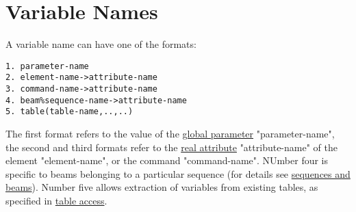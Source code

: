 
\section{Variable Names}
\label{sec:variable}

A variable name can have one of the formats: 
\begin{verbatim}
1. parameter-name
2. element-name->attribute-name
3. command-name->attribute-name
4. beam%sequence-name->attribute-name
5. table(table-name,..,..)
\end{verbatim} 

The first format refers to the value of the \href{parameter.html}{global
  parameter} "parameter-name", the second and third formats refer to the
\href{real.html}{real attribute} "attribute-name" of the element
"element-name", or the command "command-name". NUmber four is specific
to beams belonging to a particular sequence (for details see
\href{sequence.html#beam}{sequences and beams}). Number five allows
extraction of variables from existing tables, as specified in
\href{expression.html#table}{table access}.  

